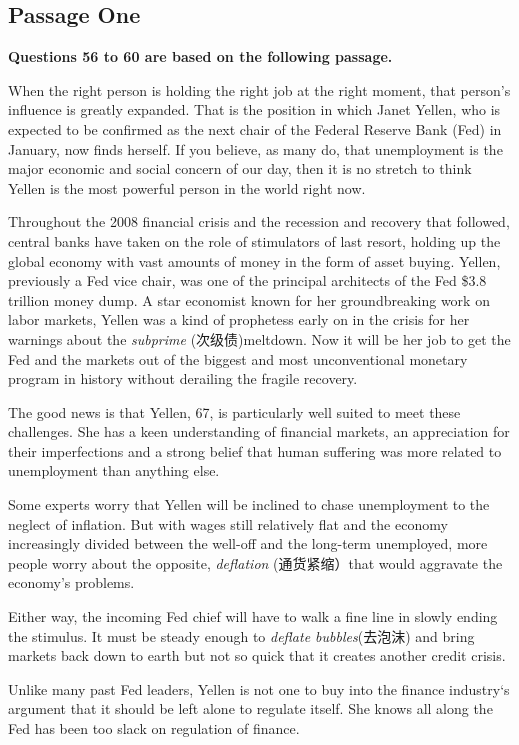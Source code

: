 \documentclass[UTF8,11pt]{ctexart}
\begin{document}
\subsection*{\textbf{Passage One}}


\textbf{Questions 56 to 60 are based on the following passage.}


When the right person is holding the right job at the right moment, that person’s influence is greatly expanded. That is the position in which Janet Yellen, who is expected to be confirmed as the next chair of the Federal Reserve Bank (Fed) in January, now finds herself. If you believe, as many do, that unemployment is the major economic and social concern of our day, then it is no stretch to think Yellen is the most powerful person in the world right now.


Throughout the 2008 financial crisis and the recession and recovery that followed, central banks have taken on the role of stimulators of last resort, holding up the global economy with vast amounts of money in the form of asset buying. Yellen, previously a Fed vice chair, was one of the principal architects of the Fed \$3.8 trillion money dump. A star economist known for her groundbreaking work on labor markets, Yellen was a kind of prophetess early on in the crisis for her warnings about the \textit{subprime} (次级债)meltdown. Now it will be her job to get the Fed and the markets out of the biggest and most unconventional monetary program in history without derailing the fragile recovery.


The good news is that Yellen, 67, is particularly well suited to meet these challenges. She has a keen understanding of financial markets, an appreciation for their imperfections and a strong belief that human suffering was more related to unemployment than anything else.


Some experts worry that Yellen will be inclined to chase unemployment to the neglect of inflation. But with wages still relatively flat and the economy increasingly divided between the well-off and the long-term unemployed, more people worry about the opposite,\textit{ deflation} (通货紧缩）that would aggravate the economy’s problems.


Either way, the incoming Fed chief will have to walk a fine line in slowly ending the stimulus. It must be steady enough to \textit{deflate bubbles}(去泡沫) and bring markets back down to earth but not so quick that it creates another credit crisis.


Unlike many past Fed leaders, Yellen is not one to buy into the finance industry‘s argument that it should be left alone to regulate itself. She knows all along the Fed has been too slack on regulation of finance.
\end{document}
